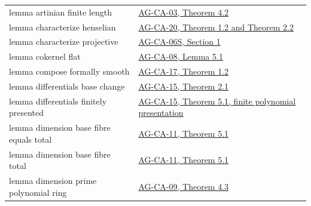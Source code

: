 \documentclass[11pt,a4paper,openany]{report}
\begin{document}
{\begin{longtable}[]{@{}
  >{\raggedright\arraybackslash}p{}
  >{\raggedright\arraybackslash}p{}@{}}
lemma artinian finite length & \href{https://github.com/KokunoYumeto/open-math-courses/blob/d02d0a3669f42579db037cd44de1d113fdd770a1/docs/courses/AG-CA/src/noetherian-and-artinian-rings.md}{AG-CA-03, Theorem 4.2} \\
lemma characterize henselian & \href{https://github.com/KokunoYumeto/open-math-courses/blob/main/docs/courses/AG-CA/henselian-local-rings-and-henselization.html}{AG-CA-20, Theorem 1.2 and Theorem 2.2} \\
lemma characterize projective & \href{https://github.com/KokunoYumeto/open-math-courses/blob/d02d0a3669f42579db037cd44de1d113fdd770a1/docs/courses/AG-CA/src/resolutions-tor-and-ext.md}{AG-CA-06S, Section 1} \\
lemma cokernel flat & \href{https://github.com/KokunoYumeto/open-math-courses/blob/d02d0a3669f42579db037cd44de1d113fdd770a1/docs/courses/AG-CA/src/faithful-flatness-and-the-local-criterion-for-flatness.md}{AG-CA-08, Lemma 5.1} \\
lemma compose formally smooth & \href{https://github.com/KokunoYumeto/open-math-courses/blob/d02d0a3669f42579db037cd44de1d113fdd770a1/docs/courses/AG-CA/src/formally-smooth-unramified-and-etale-ring-maps.md}{AG-CA-17, Theorem 1.2} \\
lemma differentials base change & \href{https://github.com/KokunoYumeto/open-math-courses/blob/d02d0a3669f42579db037cd44de1d113fdd770a1/docs/courses/AG-CA/src/kahler-differentials.md}{AG-CA-15, Theorem 2.1} \\
lemma differentials finitely presented & \href{https://github.com/KokunoYumeto/open-math-courses/blob/d02d0a3669f42579db037cd44de1d113fdd770a1/docs/courses/AG-CA/src/kahler-differentials.md}{AG-CA-15, Theorem 5.1, finite polynomial presentation} \\
lemma dimension base fibre equals total & \href{https://github.com/KokunoYumeto/open-math-courses/blob/d02d0a3669f42579db037cd44de1d113fdd770a1/docs/courses/AG-CA/src/dimension-theory-of-noetherian-local-rings.md}{AG-CA-11, Theorem 5.1} \\
lemma dimension base fibre total & \href{https://github.com/KokunoYumeto/open-math-courses/blob/d02d0a3669f42579db037cd44de1d113fdd770a1/docs/courses/AG-CA/src/dimension-theory-of-noetherian-local-rings.md}{AG-CA-11, Theorem 5.1} \\
lemma dimension prime polynomial ring & \href{https://github.com/KokunoYumeto/open-math-courses/blob/d02d0a3669f42579db037cd44de1d113fdd770a1/docs/courses/AG-CA/src/krull-dimension-and-noether-normalization.md}{AG-CA-09, Theorem 4.3} \\

\end{longtable}}
\end{document}
